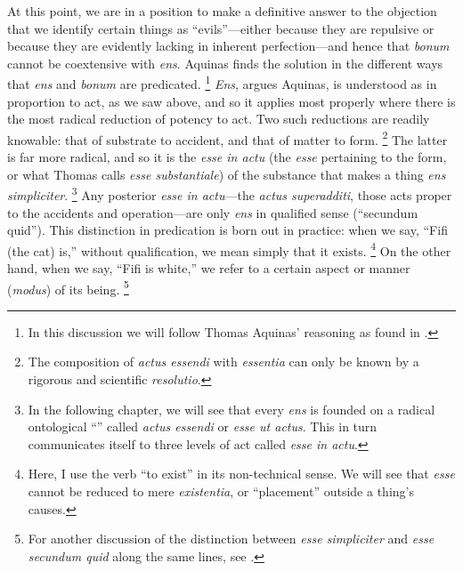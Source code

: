 {At this point, we are in a position to make a definitive answer to the objection that we identify certain things as ``evils''---either because they are repulsive or because they are evidently lacking in inherent perfection---and hence that \emph{bonum} cannot be coextensive with \emph{ens}. Aquinas finds the solution in the different ways that \emph{ens} and \emph{bonum} are predicated.%
%
\footnote{In this discussion we will follow Thomas Aquinas' reasoning as found in \cite[I, q.~5, a.~1, co.]{st:summa}.} \emph{Ens}, argues Aquinas, is understood as in proportion to act, as we saw above, and so it applies most properly where there is the most radical reduction of potency to act. Two such reductions are readily knowable: that of substrate to accident, and that of matter to form.%
%
\footnote{The composition of \emph{actus essendi} with \emph{essentia} can only be known by a rigorous and scientific \emph{resolutio}.} The latter is far more radical, and so it is the \emph{esse in actu} (the \emph{esse} pertaining to the form, or what Thomas calls \emph{esse substantiale}) of the substance that makes a thing \emph{ens simpliciter}.%
%
\footnote{In the following chapter, we will see that every \emph{ens} is founded on a radical ontological ``'' called \emph{actus essendi} or \emph{esse ut actus}. This  in turn communicates itself to three levels of act called \emph{esse in actu}.} Any posterior \emph{esse in actu}---the \emph{actus superadditi}, those acts proper to the accidents and operation---are only \emph{ens} in qualified sense (``secundum quid''). This distinction in predication is born out in practice: when we say, ``Fifi (the cat) is,'' without qualification, we mean simply that it exists.%
%
\footnote{Here, I use the verb ``to exist'' in its non-technical sense. We will see that \emph{esse} cannot be reduced to mere \emph{existentia}, or ``placement'' outside a thing's causes.} On the other hand, when we say, ``Fifi is white,'' we refer to a certain aspect or manner (\emph{modus}) of its being.%
%
\footnote{For another discussion of the distinction between \emph{esse simpliciter} and \emph{esse secundum quid} along the same lines, see \cite[I, q.~76, a.~4, co.]{st:summa}.}
%

}
